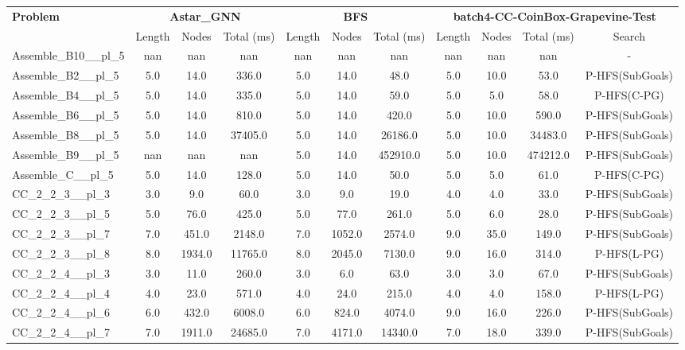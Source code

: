 \begin{table}[!ht]
\centering
\scriptsize
\begin{tabular}{l|ccc|ccc|cccc}
\multirow{2}{*}{\textbf{Problem}} & \multicolumn{3}{c|}{\textbf{Astar\_GNN}} & \multicolumn{3}{c|}{\textbf{BFS}} & \multicolumn{4}{c}{\textbf{batch4-CC-CoinBox-Grapevine-Test}} \\
\cline{2-11}
& Length & Nodes & Total (ms) & Length & Nodes & Total (ms) & Length & Nodes & Total (ms) & Search \\
\hline
Assemble\_B10\_\_pl\_5 & nan & nan & nan & nan & nan & nan & nan & nan & nan & - \\
Assemble\_B2\_\_pl\_5 & 5.0 & 14.0 & 336.0 & 5.0 & 14.0 & 48.0 & 5.0 & 10.0 & 53.0 & P-HFS(SubGoals) \\
Assemble\_B4\_\_pl\_5 & 5.0 & 14.0 & 335.0 & 5.0 & 14.0 & 59.0 & 5.0 & 5.0 & 58.0 & P-HFS(C-PG) \\
Assemble\_B6\_\_pl\_5 & 5.0 & 14.0 & 810.0 & 5.0 & 14.0 & 420.0 & 5.0 & 10.0 & 590.0 & P-HFS(SubGoals) \\
Assemble\_B8\_\_pl\_5 & 5.0 & 14.0 & 37405.0 & 5.0 & 14.0 & 26186.0 & 5.0 & 10.0 & 34483.0 & P-HFS(SubGoals) \\
Assemble\_B9\_\_pl\_5 & nan & nan & nan & 5.0 & 14.0 & 452910.0 & 5.0 & 10.0 & 474212.0 & P-HFS(SubGoals) \\
Assemble\_C\_\_pl\_5 & 5.0 & 14.0 & 128.0 & 5.0 & 14.0 & 50.0 & 5.0 & 5.0 & 61.0 & P-HFS(C-PG) \\
CC\_2\_2\_3\_\_pl\_3 & 3.0 & 9.0 & 60.0 & 3.0 & 9.0 & 19.0 & 4.0 & 4.0 & 33.0 & P-HFS(SubGoals) \\
CC\_2\_2\_3\_\_pl\_5 & 5.0 & 76.0 & 425.0 & 5.0 & 77.0 & 261.0 & 5.0 & 6.0 & 28.0 & P-HFS(SubGoals) \\
CC\_2\_2\_3\_\_pl\_7 & 7.0 & 451.0 & 2148.0 & 7.0 & 1052.0 & 2574.0 & 9.0 & 35.0 & 149.0 & P-HFS(SubGoals) \\
CC\_2\_2\_3\_\_pl\_8 & 8.0 & 1934.0 & 11765.0 & 8.0 & 2045.0 & 7130.0 & 9.0 & 16.0 & 314.0 & P-HFS(L-PG) \\
CC\_2\_2\_4\_\_pl\_3 & 3.0 & 11.0 & 260.0 & 3.0 & 6.0 & 63.0 & 3.0 & 3.0 & 67.0 & P-HFS(SubGoals) \\
CC\_2\_2\_4\_\_pl\_4 & 4.0 & 23.0 & 571.0 & 4.0 & 24.0 & 215.0 & 4.0 & 4.0 & 158.0 & P-HFS(L-PG) \\
CC\_2\_2\_4\_\_pl\_6 & 6.0 & 432.0 & 6008.0 & 6.0 & 824.0 & 4074.0 & 9.0 & 16.0 & 226.0 & P-HFS(SubGoals) \\
CC\_2\_2\_4\_\_pl\_7 & 7.0 & 1911.0 & 24685.0 & 7.0 & 4171.0 & 14340.0 & 7.0 & 18.0 & 339.0 & P-HFS(SubGoals) \\

\end{tabular}
\end{table}
